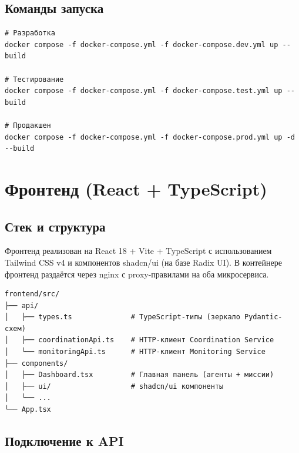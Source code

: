 \documentclass[12pt,a4paper]{article}
\begin{document}
\subsection{Команды запуска}

\begin{lstlisting}[style=bash, caption={Запуск системы в разных окружениях}]
# Разработка
docker compose -f docker-compose.yml -f docker-compose.dev.yml up --build

# Тестирование
docker compose -f docker-compose.yml -f docker-compose.test.yml up --build

# Продакшен
docker compose -f docker-compose.yml -f docker-compose.prod.yml up -d --build
\end{lstlisting}

\section{Фронтенд (React + TypeScript)}

\subsection{Стек и структура}

Фронтенд реализован на React 18 + Vite + TypeScript с использованием
Tailwind CSS v4 и компонентов shadcn/ui (на базе Radix UI).
В контейнере фронтенд раздаётся через nginx с proxy-правилами на
оба микросервиса.

\begin{lstlisting}[style=bash, caption={Структура frontend/src/}]
frontend/src/
├── api/
│   ├── types.ts              # TypeScript-типы (зеркало Pydantic-схем)
│   ├── coordinationApi.ts    # HTTP-клиент Coordination Service
│   └── monitoringApi.ts      # HTTP-клиент Monitoring Service
├── components/
│   ├── Dashboard.tsx         # Главная панель (агенты + миссии)
│   ├── ui/                   # shadcn/ui компоненты
│   └── ...
└── App.tsx
\end{lstlisting}

\subsection{Подключение к API}
\end{document}

